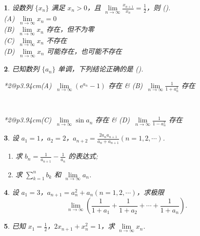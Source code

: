 \documentclass[openany,twocolumn]{ctexbook}
\makeatletter
\theoremstyle{change}
\newtheorem{ti}{}[section]
\def\kuo{ (\hspace{1pc})}
\newcommand{\twoch}[4]{\\\begin{tabular}{*{2}{@{}p{3.94cm}}}(A)~#1 & (B)~#2\end{tabular}\\\begin{tabular}{*{2}{@{}p{3.94cm}}}(C)~#3 & (D)~#4\end{tabular}}  %
\newcommand{\onech}[4]{\\(A)~#1 \\ (B)~#2 \\ (C)~#3 \\ (D)~#4}  %
\def\ee{\mathrm{e}}
\edef\lim{\lim\limits}
\makeatother
\begin{document}
	\begin{ti}
		设数列 $\{ x_{n} \}$ 满足 $x_{n} > 0$，且 $\lim_{n \to \infty}\frac{x_{n+1}}{x_{n}} = \frac{1}{2}$，则\kuo.
		\onech{$\lim_{n\to\infty}x_{n} = 0$}{$\lim_{n\to\infty}x_{n}$ 存在，但不为零}{$\lim_{n\to\infty}x_{n}$ 不存在}{$\lim_{n\to\infty}x_{n}$ 可能存在，也可能不存在}
	\end{ti}

	\begin{ti}
		已知数列 $\{ a_{n} \}$ 单调，下列结论正确的是\kuo.
		\twoch{$\lim_{n \to \infty}\left( \ee^{a_{n}} - 1 \right)$ 存在}{$\lim_{n \to \infty} \frac{1}{1 + a_{n}^{2}}$ 存在}{$\lim_{n \to \infty} \sin a_{n}$ 存在}{$\lim_{n \to \infty} \frac{1}{1 - a_{n}^{2}}$ 存在}
	\end{ti}

	\begin{ti}
		设 $a_{1} = 1$，$a_{2} = 2$，$a_{n+2} = \frac{2a_{n}a_{n+1}}{a_{n} + a_{n+1}} (n=1,2,\cdots)$.
		\begin{enumerate}
			\item 求 $b_{n} = \frac{1}{a_{n+1}} - \frac{1}{a_{n}}$ 的表达式;
			\item 求 $\sum_{k=1}^{n} b_{k}$ 和 $\lim_{n \to \infty} a_{n}$.
		\end{enumerate}
	\end{ti}

	\begin{ti}
		设 $a_{1} = 3$，$a_{n+1} = a_{n}^{2} + a_{n}(n = 1,2,\cdots)$，求极限
		\[
			\lim_{n \to \infty} \left( \frac{1}{1 + a_{1}} + \frac{1}{1 + a_{2}} + \cdots + \frac{1}{1 + a_{n}} \right).
		\]
	\end{ti}
	
	\begin{ti}
		已知 $x_{1} = \frac{1}{2}$，$2 x_{n+1} + x_{n}^{2} = 1$，求 $\lim_{n \to \infty} x_{n}$.
	\end{ti}
\end{document}
